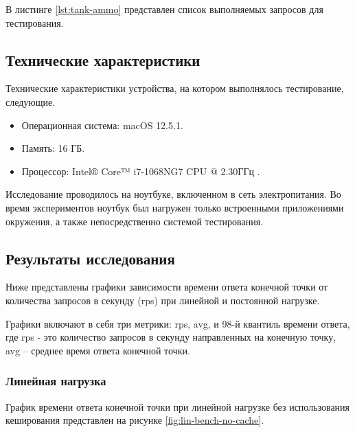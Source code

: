 \newpage
В листинге \ref{lst:tank-ammo} представлен список выполняемых запросов для тестирования.


\subsection*{Технические характеристики}
Технические характеристики устройства, на котором выполнялось тестирование, следующие.

\begin{itemize}
	\item Операционная система: macOS 12.5.1.
	\item Память: 16 ГБ.
	\item Процессор: Intel® Core™ i7-1068NG7  CPU @ 2.30ГГц \cite{intel}.
\end{itemize}

Исследование проводилось на ноутбуке, включенном в сеть электропитания. Во время экспериментов ноутбук был нагружен только встроенными приложениями окружения, а также непосредственно системой тестирования.

\newpage
\subsection{Результаты исследования}

Ниже представлены графики зависимости времени ответа конечной точки от количества запросов в секунду (rps) при линейной и постоянной нагрузке. 

Графики включают в себя три метрики: rps, avg, и 98-й квантиль времени ответа, где 
rps - это количество запросов в секунду направленных на конечную точку,
avg -- среднее время ответа конечной точки.


\subsubsection*{Линейная нагрузка}

График времени  ответа конечной точки при линейной
нагрузке без использования кеширования представлен на рисунке \ref{fig:lin-bench-no-cache}.


